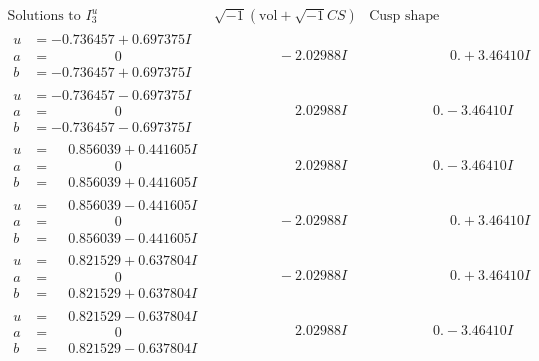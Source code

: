 \documentclass[1p]{elsarticle_modified}
\theoremstyle{definition}
\newcommand{\I}{\sqrt{-1}}
\begin{document}
$$\begin{array}{c|c|c}  
\text{Solutions to }I^u_{3}& \I (\text{vol} + \sqrt{-1}CS) & \text{Cusp shape}\\
 \hline 
\begin{aligned}
u &= -0.736457 + 0.697375 I \\
a &= \phantom{-0.000000 } 0 \\
b &= -0.736457 + 0.697375 I\end{aligned}
 & \phantom{-0.000000 } -2.02988 I & \phantom{-0.000000 -}0. + 3.46410 I \\ \hline\begin{aligned}
u &= -0.736457 - 0.697375 I \\
a &= \phantom{-0.000000 } 0 \\
b &= -0.736457 - 0.697375 I\end{aligned}
 & \phantom{-0.000000 -}2.02988 I & \phantom{-0.000000 } 0. - 3.46410 I \\ \hline\begin{aligned}
u &= \phantom{-}0.856039 + 0.441605 I \\
a &= \phantom{-0.000000 } 0 \\
b &= \phantom{-}0.856039 + 0.441605 I\end{aligned}
 & \phantom{-0.000000 -}2.02988 I & \phantom{-0.000000 } 0. - 3.46410 I \\ \hline\begin{aligned}
u &= \phantom{-}0.856039 - 0.441605 I \\
a &= \phantom{-0.000000 } 0 \\
b &= \phantom{-}0.856039 - 0.441605 I\end{aligned}
 & \phantom{-0.000000 } -2.02988 I & \phantom{-0.000000 -}0. + 3.46410 I \\ \hline\begin{aligned}
u &= \phantom{-}0.821529 + 0.637804 I \\
a &= \phantom{-0.000000 } 0 \\
b &= \phantom{-}0.821529 + 0.637804 I\end{aligned}
 & \phantom{-0.000000 } -2.02988 I & \phantom{-0.000000 -}0. + 3.46410 I \\ \hline\begin{aligned}
u &= \phantom{-}0.821529 - 0.637804 I \\
a &= \phantom{-0.000000 } 0 \\
b &= \phantom{-}0.821529 - 0.637804 I\end{aligned}
 & \phantom{-0.000000 -}2.02988 I & \phantom{-0.000000 } 0. - 3.46410 I \\ \hline\begin{aligned}

\end{aligned}
\end{array}$$
\end{document}
